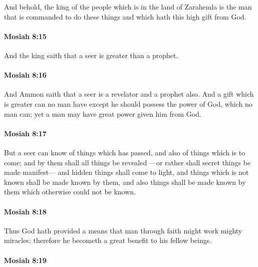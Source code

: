 			And behold, the king of the people which is in the land of Zarahemla
			is the man that is commanded to do these things
			and which hath this high gift from God.

		\paragraph{Mosiah 8:15} %
			\label{MOSIAH-8-15}

			And the king saith that a seer is greater than a prophet.

		\paragraph{Mosiah 8:16} %
			\label{MOSIAH-8-16}

			And Ammon saith that a seer is a revelator and a prophet also.
			And a gift which is greater can no man have
			except he should possess the power of God, which no man can;
			yet a man may have great power given him from God.

		\paragraph{Mosiah 8:17} %
			\label{MOSIAH-8-17}

			But a seer can know of things which has passed,
			and also of things which is to come;
			and by them shall all things be revealed
			---or rather shall secret things be made manifest---
			and hidden things shall come to light,
			and things which is not known shall be made known by them,
			and also things shall be made known by them
			which otherwise could not be known.

		\paragraph{Mosiah 8:18} %
			\label{MOSIAH-8-18}

			Thus God hath provided a means
			that man through faith might work mighty miracles;
			therefore he becometh a great benefit to his fellow beings.

		\paragraph{Mosiah 8:19} %
			\label{MOSIAH-8-19}

